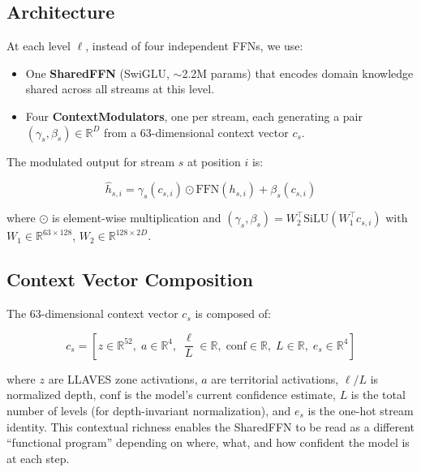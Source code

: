 \documentclass[11pt,a4paper]{article}
\begin{document}
\subsection{Architecture}

At each level $\ell$, instead of four independent FFNs, we use:

\begin{itemize}
    \item One \textbf{SharedFFN} (SwiGLU, $\sim$2.2M params) that encodes
    domain knowledge shared across all streams at this level.
    \item Four \textbf{ContextModulators}, one per stream, each generating
    a pair $(\gamma_s, \beta_s) \in \mathbb{R}^{D}$ from a
    63-dimensional context vector $c_s$.
\end{itemize}

The modulated output for stream $s$ at position $i$ is:

\begin{equation}
    \hat{h}_{s,i} = \gamma_s(c_{s,i}) \odot \text{FFN}(h_{s,i})
                  + \beta_s(c_{s,i})
    \label{eq:film}
\end{equation}

where $\odot$ is element-wise multiplication and
$(\gamma_s, \beta_s) = W_2^\top \text{SiLU}(W_1^\top c_{s,i})$
with $W_1 \in \mathbb{R}^{63 \times 128}$, $W_2 \in \mathbb{R}^{128 \times 2D}$.

\subsection{Context Vector Composition}

The 63-dimensional context vector $c_s$ is composed of:

\begin{equation}
    c_s = \left[
        z \in \mathbb{R}^{52},\;
        a \in \mathbb{R}^{4},\;
        \frac{\ell}{L} \in \mathbb{R},\;
        \text{conf} \in \mathbb{R},\;
        L \in \mathbb{R},\;
        e_s \in \mathbb{R}^{4}
    \right]
    \label{eq:context_vector}
\end{equation}

where $z$ are LLAVES zone activations, $a$ are territorial activations,
$\ell/L$ is normalized depth, $\text{conf}$ is the model's current
confidence estimate, $L$ is the total number of levels (for
depth-invariant normalization), and $e_s$ is the one-hot stream identity.
This contextual richness enables the SharedFFN to be read as a different
``functional program'' depending on where, what, and how confident the
model is at each step.
\end{document}
